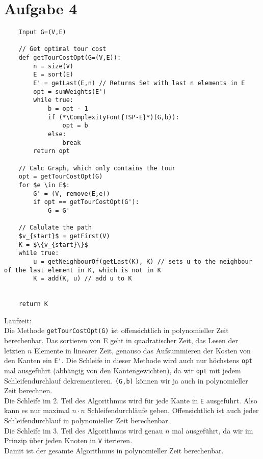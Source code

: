 \documentclass[a4paper,11pt]{scrartcl}
\begin{document}
	\section*{Aufgabe 4}
	\begin{lstlisting}
	Input G=(V,E)	
	
	// Get optimal tour cost
	def getTourCostOpt(G=(V,E)):
		n = size(V)
		E = sort(E)
		E' = getLast(E,n) // Returns Set with last n elements in E
		opt = sumWeights(E')
		while true:
			b = opt - 1
			if (*\ComplexityFont{TSP-E}*)(G,b)):
				opt = b
			else:
				break
		return opt
	
	// Calc Graph, which only contains the tour
	opt = getTourCostOpt(G)
	for $e \in E$:
		G' = (V, remove(E,e))
		if opt == getTourCostOpt(G'):
			G = G'
	
	// Calulate the path
	$v_{start}$ = getFirst(V)
	K = $\{v_{start}\}$
	while true:
		u = getNeighbourOf(getLast(K), K) // sets u to the neighbour of the last element in K, which is not in K
		K = add(K, u) // add u to K
	
	
	return K
	\end{lstlisting}
	
	Laufzeit:\\
	Die Methode \verb|getTourCostOpt(G)| ist offensichtlich in polynomieller Zeit berechenbar. Das sortieren von E geht in quadratischer Zeit, das Lesen der letzten $n$ Elemente in linearer Zeit, genauso das Aufsummieren der Kosten von den Kanten ein \verb|E'|. Die Schleife in dieser Methode wird auch nur höchstens \verb|opt| mal ausgeführt (abhängig von den Kantengewichten), da wir \verb|opt| mit jedem Schleifendurchlauf dekrementieren. \verb|(G,b)| können wir ja auch in polynomieller Zeit berechnen.\\
	Die Schleife im 2. Teil des Algorithmus wird für jede Kante in \verb|E| ausgeführt. Also kann es nur maximal $n \cdot n$ Schleifendurchläufe geben. Offensichtlich ist auch jeder Schleifendurchlauf in polynomieller Zeit berechenbar.\\
	Die Schleife im 3. Teil des Algorithmus wird genau $n$ mal ausgeführt, da wir im Prinzip über jeden Knoten in \verb|V| iterieren.\\
	Damit ist der gesamte Algorithmus in polynomieller Zeit berechenbar.\\
	
\end{document}
